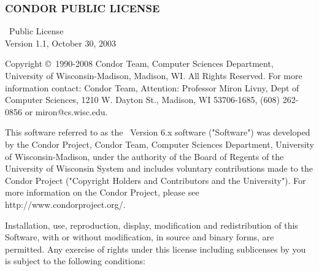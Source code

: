 \subsubsection*{\label{sec:condor-public-license}CONDOR PUBLIC LICENSE}

\begin{flushleft}
\CondorR\ Public License \\
Version 1.1, October 30, 2003
\end{flushleft}

Copyright \copyright\ 1990-2008 Condor Team, Computer Sciences Department,
University of Wisconsin-Madison, Madison, WI. All Rights Reserved.  For
more information contact: Condor Team, Attention: Professor Miron Livny,
Dept of Computer Sciences, 1210 W. Dayton St., Madison, WI 53706-1685, (608)
262-0856 or miron@cs.wisc.edu. 

This software referred to as the \CondorR\ Version 6.x software
("Software") was developed by the Condor Project, Condor Team,
Computer Sciences Department, University of Wisconsin-Madison, under
the authority of the Board of Regents of the  University of Wisconsin
System and includes voluntary contributions made to the Condor Project
("Copyright Holders and Contributors and the University").  For more
information on the Condor Project, please see
http://www.condorproject.org/.

Installation, use, reproduction, display, modification and
redistribution of this Software, with or without modification,  in
source and binary forms, are permitted.  Any exercise of rights under
this license including sublicenses by you is subject to the following
conditions:

